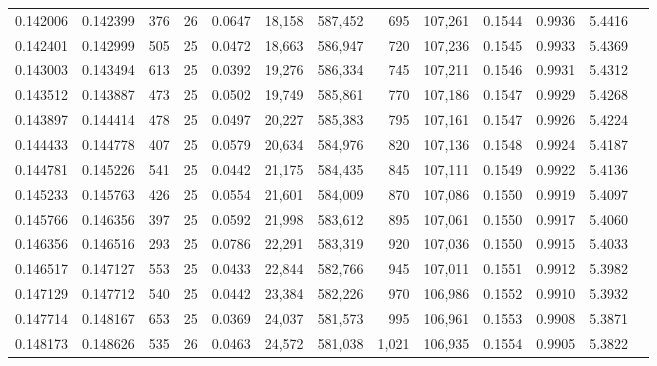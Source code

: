 \begin{tabular}{rrrrrrrrrrrrr}
0.142006 & 0.142399 &   376 &  26 &                                     0.0647 &  18,158 & 587,452 &     695 & 107,261 & 0.1544 & 0.9936 & 5.4416 \\
0.142401 & 0.142999 &   505 &  25 &                                     0.0472 &  18,663 & 586,947 &     720 & 107,236 & 0.1545 & 0.9933 & 5.4369 \\
0.143003 & 0.143494 &   613 &  25 &                                     0.0392 &  19,276 & 586,334 &     745 & 107,211 & 0.1546 & 0.9931 & 5.4312 \\
0.143512 & 0.143887 &   473 &  25 &                                     0.0502 &  19,749 & 585,861 &     770 & 107,186 & 0.1547 & 0.9929 & 5.4268 \\
0.143897 & 0.144414 &   478 &  25 &                                     0.0497 &  20,227 & 585,383 &     795 & 107,161 & 0.1547 & 0.9926 & 5.4224 \\
0.144433 & 0.144778 &   407 &  25 &                                     0.0579 &  20,634 & 584,976 &     820 & 107,136 & 0.1548 & 0.9924 & 5.4187 \\
0.144781 & 0.145226 &   541 &  25 &                                     0.0442 &  21,175 & 584,435 &     845 & 107,111 & 0.1549 & 0.9922 & 5.4136 \\
0.145233 & 0.145763 &   426 &  25 &                                     0.0554 &  21,601 & 584,009 &     870 & 107,086 & 0.1550 & 0.9919 & 5.4097 \\
0.145766 & 0.146356 &   397 &  25 &                                     0.0592 &  21,998 & 583,612 &     895 & 107,061 & 0.1550 & 0.9917 & 5.4060 \\
0.146356 & 0.146516 &   293 &  25 &                                     0.0786 &  22,291 & 583,319 &     920 & 107,036 & 0.1550 & 0.9915 & 5.4033 \\
0.146517 & 0.147127 &   553 &  25 &                                     0.0433 &  22,844 & 582,766 &     945 & 107,011 & 0.1551 & 0.9912 & 5.3982 \\
0.147129 & 0.147712 &   540 &  25 &                                     0.0442 &  23,384 & 582,226 &     970 & 106,986 & 0.1552 & 0.9910 & 5.3932 \\
0.147714 & 0.148167 &   653 &  25 &                                     0.0369 &  24,037 & 581,573 &     995 & 106,961 & 0.1553 & 0.9908 & 5.3871 \\
0.148173 & 0.148626 &   535 &  26 &                                     0.0463 &  24,572 & 581,038 &   1,021 & 106,935 & 0.1554 & 0.9905 & 5.3822 \\

\end{tabular}
